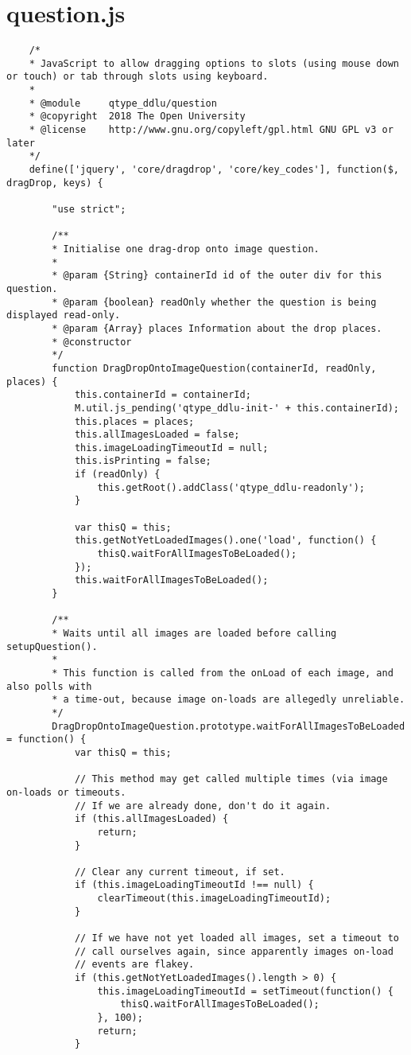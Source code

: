 \section{question.js} \label{ap1:sec2}
\begin{lstlisting} 
	/*
	* JavaScript to allow dragging options to slots (using mouse down or touch) or tab through slots using keyboard.
	*
	* @module     qtype_ddlu/question
	* @copyright  2018 The Open University
	* @license    http://www.gnu.org/copyleft/gpl.html GNU GPL v3 or later
	*/
	define(['jquery', 'core/dragdrop', 'core/key_codes'], function($, dragDrop, keys) {
		
		"use strict";
		
		/**
		* Initialise one drag-drop onto image question.
		*
		* @param {String} containerId id of the outer div for this question.
		* @param {boolean} readOnly whether the question is being displayed read-only.
		* @param {Array} places Information about the drop places.
		* @constructor
		*/
		function DragDropOntoImageQuestion(containerId, readOnly, places) {
			this.containerId = containerId;
			M.util.js_pending('qtype_ddlu-init-' + this.containerId);
			this.places = places;
			this.allImagesLoaded = false;
			this.imageLoadingTimeoutId = null;
			this.isPrinting = false;
			if (readOnly) {
				this.getRoot().addClass('qtype_ddlu-readonly');
			}
			
			var thisQ = this;
			this.getNotYetLoadedImages().one('load', function() {
				thisQ.waitForAllImagesToBeLoaded();
			});
			this.waitForAllImagesToBeLoaded();
		}
		
		/**
		* Waits until all images are loaded before calling setupQuestion().
		*
		* This function is called from the onLoad of each image, and also polls with
		* a time-out, because image on-loads are allegedly unreliable.
		*/
		DragDropOntoImageQuestion.prototype.waitForAllImagesToBeLoaded = function() {
			var thisQ = this;
			
			// This method may get called multiple times (via image on-loads or timeouts.
			// If we are already done, don't do it again.
			if (this.allImagesLoaded) {
				return;
			}
			
			// Clear any current timeout, if set.
			if (this.imageLoadingTimeoutId !== null) {
				clearTimeout(this.imageLoadingTimeoutId);
			}
			
			// If we have not yet loaded all images, set a timeout to
			// call ourselves again, since apparently images on-load
			// events are flakey.
			if (this.getNotYetLoadedImages().length > 0) {
				this.imageLoadingTimeoutId = setTimeout(function() {
					thisQ.waitForAllImagesToBeLoaded();
				}, 100);
				return;
			}
			

\end{lstlisting}
